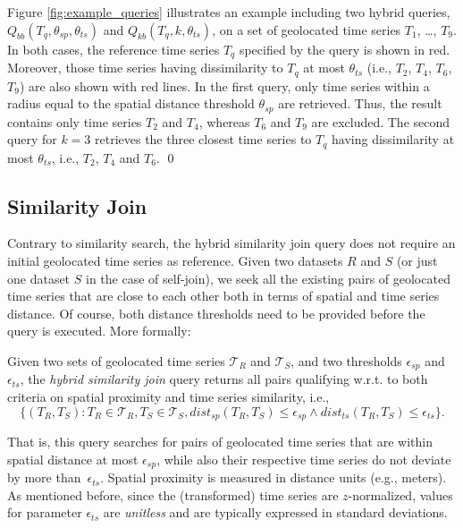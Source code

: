 \begin{myexample}
 Figure \ref{fig:example_queries} illustrates an example including two hybrid queries, $Q_{bb}(T_q, \theta_{sp}, \theta_{ts})$ and $Q_{kb}(T_q, k, \theta_{ts})$, on a set of geolocated time series $T_1$, \ldots, $T_9$. In both cases, the reference time series $T_q$ specified by the query is shown in red. Moreover, those time series having dissimilarity to $T_q$ at most $\theta_{ts}$ (i.e., $T_2$, $T_4$, $T_6$, $T_9$) are also shown with red lines. In the first query, only time series within a radius equal to the spatial distance threshold $\theta_{sp}$ are retrieved. Thus, the result contains only time series $T_2$ and $T_4$, whereas $T_6$ and $T_9$ are excluded. The second query for $k=3$ retrieves the three closest time series to $T_q$ having dissimilarity at most $\theta_{ts}$, i.e., $T_2$, $T_4$ and $T_6$. \qed
\end{myexample}

\subsection{Similarity Join}
\label{subsec:sim_join_prob}
Contrary to similarity search, the hybrid similarity join query does not require an initial geolocated time series as reference. Given two datasets $R$ and $S$ (or just one dataset $S$ in the case of self-join), we seek all the existing pairs of geolocated time series that are close to each other both in terms of spatial and time series distance. Of course, both distance thresholds need to be provided before the query is executed. More formally:

\begin{mydefinition}\label{def:sim_join}
  Given two sets of geolocated time series $\mathcal{T}_{R}$ and $\mathcal{T}_{S}$, and two thresholds $\epsilon_{sp}$ and $\epsilon_{ts}$, the {\em hybrid similarity join} query returns all pairs qualifying w.r.t. to both criteria on spatial proximity and time series similarity, i.e., 
  \[ \{ (T_{R}, T_{S}): T_{R} \in \mathcal{T}_{R}, T_{S} \in \mathcal{T}_{S}, dist_{sp}(T_{R}, T_{S})\leq\epsilon_{sp} \land dist_{ts}(T_{R}, T_{S}) \leq \epsilon_{ts} \}. \] 
\end{mydefinition} 
 
That is, this query searches for pairs of geolocated time series that are within spatial distance at most $\epsilon_{sp}$, while also their respective time series do not deviate by more than~$\epsilon_{ts}$. Spatial proximity is measured in distance units (e.g., meters). As mentioned before, since the (transformed) time series are $z$-normalized, values for parameter $\epsilon_{ts}$ are {\em unitless} and are typically expressed in standard deviations.
  
